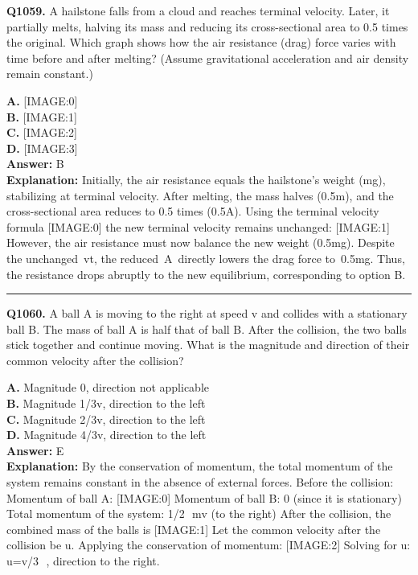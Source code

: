 \documentclass[12pt]{article}
\begin{document}
\noindent
\textbf{Q1059.} A hailstone falls from a cloud and reaches terminal velocity. Later, it partially melts, halving its mass and reducing its cross-sectional area to 0.5 times the original. Which graph shows how the air resistance (drag) force varies with time before and after melting? (Assume gravitational acceleration and air density remain constant.)



\textbf{A.} [IMAGE:0] \\
\textbf{B.} [IMAGE:1] \\
\textbf{C.} [IMAGE:2] \\
\textbf{D.} [IMAGE:3] \\

\textbf{Answer:} B \\
\textbf{Explanation:} Initially, the air resistance equals the hailstone’s weight (mg), stabilizing at terminal velocity. After melting, the mass halves (0.5m), and the cross-sectional area reduces to 0.5 times (0.5A). Using the terminal velocity formula
[IMAGE:0]
the new terminal velocity remains unchanged:
[IMAGE:1]
However, the air resistance must now balance the new weight (0.5mg). Despite the unchanged vt​, the reduced A directly lowers the drag force to 0.5mg. Thus, the resistance drops abruptly to the new equilibrium, corresponding to option B.

\hrule
\vspace{1em}


\noindent
\textbf{Q1060.} A ball A is moving to the right at speed v and collides with a stationary ball B. The mass of ball A is half that of ball B. After the collision, the two balls stick together and continue moving. What is the magnitude and direction of their common velocity after the collision?



\textbf{A.} Magnitude 0, direction not applicable \\
\textbf{B.} Magnitude 1/3v, direction to the left \\
\textbf{C.} Magnitude 2/3v, direction to the left \\
\textbf{D.} Magnitude 4/3v, direction to the left \\

\textbf{Answer:} E \\
\textbf{Explanation:} By the conservation of momentum, the total momentum of the system remains constant in the absence of external forces. Before the collision:
Momentum of ball A:
[IMAGE:0]
Momentum of ball B: 0 (since it is stationary)
Total momentum of the system: 1/2
​
mv (to the right) After the collision, the combined mass of the balls is
[IMAGE:1]
Let the common velocity after the collision be u. Applying the conservation of momentum:
[IMAGE:2]
Solving for u: u=v/3
​
, direction to the right.
\end{document}
